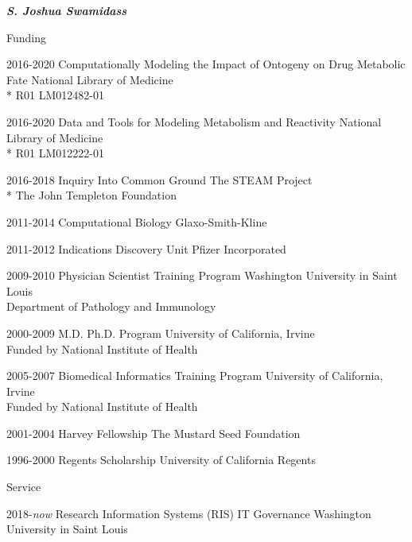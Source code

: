 \documentclass[10pt]{article}
\begin{document}
\begin{cv}{\huge \it \bfseries S. Joshua Swamidass}
\begin{cvlist}{Funding}
\item[2016-2020]  Computationally Modeling the Impact of Ontogeny on Drug Metabolic Fate
    \hspace*{\fill} National Library of Medicine \\*    \hspace*{\fill}  R01 LM012482-01
\item[2016-2020]  Data and Tools for Modeling Metabolism and Reactivity
    \hspace*{\fill} National Library of Medicine \\*    \hspace*{\fill} R01 LM012222-01
\item[2016-2018]  Inquiry Into Common Ground
    \hspace*{\fill} The STEAM Project \\*    \hspace*{\fill}  The John Templeton Foundation
\item[2011-2014]  Computational Biology   \hspace*{\fill} Glaxo-Smith-Kline
\item[2011-2012]  Indications Discovery Unit   \hspace*{\fill} Pfizer  Incorporated
\item[2009-2010] Physician Scientist Training Program \hfill Washington University in Saint Louis \\
 \hspace*{\fill} Department of Pathology and Immunology
\item[2000-2009] M.D. Ph.D. Program  \hfill University of California, Irvine \\
 \hspace*{\fill}  Funded by National Institute of Health
\item[2005-2007] Biomedical Informatics Training Program  \hfill University of California, Irvine \\
 \hspace*{\fill}  Funded by National Institute of Health
\item[2001-2004] Harvey Fellowship \hfill The Mustard Seed Foundation 
\item[1996-2000] Regents Scholarship \hfill   University of California Regents
\end{cvlist}

\begin{cvlist}{Service}
\item[2018-\emph{now}] Research Information Systems (RIS) IT Governance \hfill Washington University in Saint Louis


\end{cvlist}
\end{cv}
\end{document}
